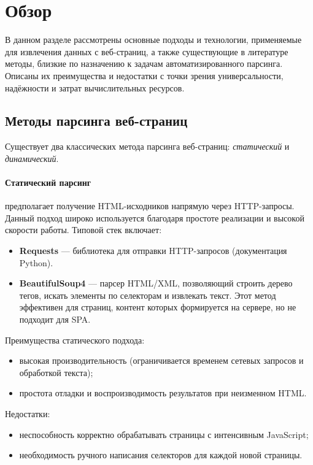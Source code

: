 
\section{Обзор}
\label{sec:relatedworks}

В данном разделе рассмотрены основные подходы и технологии, применяемые для извлечения данных с веб-страниц, а также существующие в литературе методы, близкие по назначению к задачам автоматизированного парсинга. Описаны их преимущества и недостатки с точки зрения универсальности, надёжности и затрат вычислительных ресурсов.

\subsection{Методы парсинга веб-страниц}

Существует два классических метода парсинга веб-страниц: \emph{статический} и \emph{динамический}.

\paragraph{Статический парсинг} предполагает получение HTML-исходников напрямую через HTTP-запросы. Данный подход широко используется благодаря простоте реализации и высокой скорости работы. Типовой стек включает:
\begin{itemize}
    \item \textbf{Requests} — библиотека для отправки HTTP-запросов (документация Python\cite{python-official}).
    \item \textbf{BeautifulSoup4}\cite{bs4-doc} — парсер HTML/XML, позволяющий строить дерево тегов, искать элементы по селекторам и извлекать текст. Этот метод эффективен для страниц, контент которых формируется на сервере, но не подходит для SPA.
\end{itemize}
Преимущества статического подхода:
\begin{itemize}
    \item высокая производительность (ограничивается временем сетевых запросов и обработкой текста);
    \item простота отладки и воспроизводимость результатов при неизменном HTML.
\end{itemize}
Недостатки:
\begin{itemize}
    \item неспособность корректно обрабатывать страницы с интенсивным JavaScript;
    \item необходимость ручного написания селекторов для каждой новой страницы.
\end{itemize}

